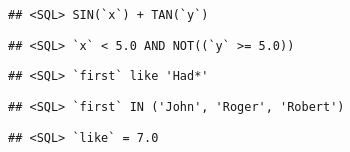 \begin{verbatim}
## <SQL> SIN(`x`) + TAN(`y`)
\end{verbatim}

\begin{Shaded}
\begin{Highlighting}[]
\OperatorTok{<}\StringTok{ } \OperatorTok{&}\StringTok{ }\OperatorTok{!}\OperatorTok{>=}\StringTok{ }\NormalTok{))}
\end{Highlighting}
\end{Shaded}

\begin{verbatim}
## <SQL> `x` < 5.0 AND NOT((`y` >= 5.0))
\end{verbatim}

\begin{Shaded}
\end{Shaded}

\begin{verbatim}
## <SQL> `first` like 'Had*'
\end{verbatim}

\begin{Shaded}
\end{Shaded}

\begin{verbatim}
## <SQL> `first` IN ('John', 'Roger', 'Robert')
\end{verbatim}

\begin{Shaded}
\begin{Highlighting}[]
\OperatorTok{==}\StringTok{ }\NormalTok{)}
\end{Highlighting}
\end{Shaded}

\begin{verbatim}
## <SQL> `like` = 7.0
\end{verbatim}


